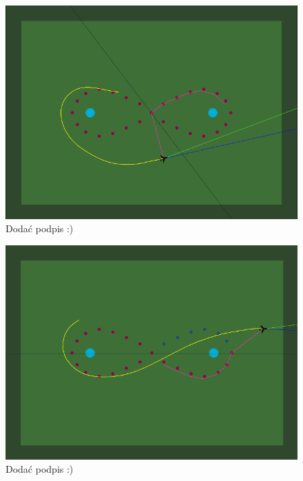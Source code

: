 \documentclass[12pt, a4paper]{article}
\begin{document}
 \begin{figure}[H]
    \centering
    \includegraphics[width=1\textwidth]{aileci1}
    \caption{Dodać podpis :)}
\end{figure}

 \begin{figure}[H]
    \centering
    \includegraphics[width=1\textwidth]{aileci2}
    \caption{Dodać podpis :)}
\end{figure}
\end{document}

